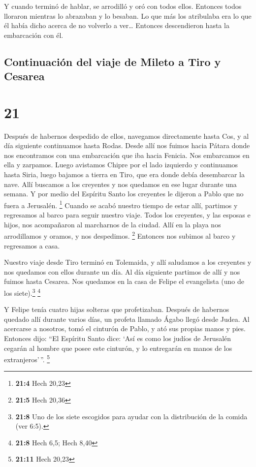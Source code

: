  Y cuando terminó de hablar, se arrodilló y oró con todos
ellos.  Entonces todos lloraron mientras lo abrazaban y
lo besaban.  Lo que más los atribulaba era lo que él
había dicho acerca de no volverlo a ver\ldots{} Entonces descendieron
hasta la embarcación con él.

\hypertarget{continuaciuxf3n-del-viaje-de-mileto-a-tiro-y-cesarea}{%
\subsection{Continuación del viaje de Mileto a Tiro y
Cesarea}\label{continuaciuxf3n-del-viaje-de-mileto-a-tiro-y-cesarea}}

\hypertarget{section-20}{%
\section{21}\label{section-20}}

 Después de habernos despedido de ellos, navegamos
directamente hasta Cos, y al día siguiente continuamos hasta Rodas.
Desde allí nos fuimos hacia Pátara  donde nos encontramos
con una embarcación que iba hacia Fenicia. Nos embarcamos en ella y
zarpamos.  Luego avistamos Chipre por el lado izquierdo y
continuamos hasta Siria, luego bajamos a tierra en Tiro, que era donde
debía desembarcar la nave.  Allí buscamos a los creyentes
y nos quedamos en ese lugar durante una semana. Y por medio del Espíritu
Santo los creyentes le dijeron a Pablo que no fuera a Jerusalén.
\footnote{\textbf{21:4} Hech 20,23}  Cuando se acabó
nuestro tiempo de estar allí, partimos y regresamos al barco para seguir
nuestro viaje. Todos los creyentes, y las esposas e hijos, nos
acompañaron al marcharnos de la ciudad. Allí en la playa nos
arrodillamos y oramos, y nos despedimos. \footnote{\textbf{21:5} Hech
  20,36}  Entonces nos subimos al barco y regresamos a
casa.

 Nuestro viaje desde Tiro terminó en Tolemaida, y allí
saludamos a los creyentes y nos quedamos con ellos durante un día.
 Al día siguiente partimos de allí y nos fuimos hasta
Cesarea. Nos quedamos en la casa de Felipe el evangelista (uno de los
siete).\footnote{\textbf{21:8} Uno de los siete escogidos para ayudar
  con la distribución de la comida (ver 6:5).} \footnote{\textbf{21:8}
  Hech 6,5; Hech 8,40}

 Y Felipe tenía cuatro hijas solteras que profetizaban.
 Después de habernos quedado allí durante varios días, un
profeta llamado Ágabo llegó desde Judea.  Al acercarse a
nosotros, tomó el cinturón de Pablo, y ató sus propias manos y pies.
Entonces dijo: ``El Espíritu Santo dice: `Así es como los judíos de
Jerusalén cegarán al hombre que posee este cinturón, y lo entregarán en
manos de los extranjeros'\,''. \footnote{\textbf{21:11} Hech 20,23}

